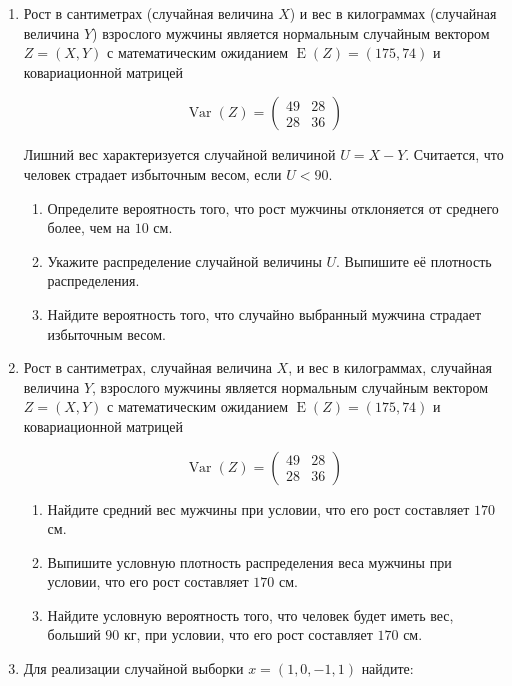 \documentclass[12pt]{article}
\DeclareMathOperator{\Var}{Var}
\DeclareMathOperator{\E}{E}
\begin{document}
\begin{enumerate}

\item Рост в сантиметрах (случайная величина $X$) и вес в килограммах (случайная величина $Y$) взрослого мужчины является нормальным случайным вектором $Z = (X, Y)$ с математическим ожиданием $\E(Z) = (175, 74)$ и ковариационной матрицей

\[
\Var(Z) = 
\begin{pmatrix}
 49 & 28 \\
28 & 36
\end{pmatrix}
\]

Лишний вес характеризуется случайной величиной $U = X - Y$. Считается, что человек страдает избыточным весом, если $U < 90$.

\begin{enumerate}
\item Определите вероятность того, что рост мужчины отклоняется от среднего более, чем на $10$ см.
\item Укажите распределение случайной величины $U$. Выпишите её плотность распределения.
\item Найдите вероятность того, что случайно выбранный мужчина страдает избыточным весом.
\end{enumerate}

\item Рост в сантиметрах, случайная величина $X$, и вес в килограммах, случайная величина $Y$, взрослого мужчины является нормальным случайным вектором $Z = (X, Y)$ с математическим ожиданием $\E(Z) = (175, 74)$ и ковариационной матрицей

\[
\Var(Z) = 
\begin{pmatrix}
 49 & 28 \\
28 & 36
\end{pmatrix}
\]

\begin{enumerate}
\item Найдите средний вес мужчины при условии, что его рост составляет $170$ см.
\item Выпишите условную плотность распределения веса мужчины при условии, что его рост составляет $170$ см.
\item Найдите условную вероятность того, что человек будет иметь вес, больший $90$ кг, при условии, что его рост составляет $170$ см.
\end{enumerate}

\item Для реализации случайной выборки $x=(1,0,-1,1)$ найдите:


\end{enumerate}
\end{document}
